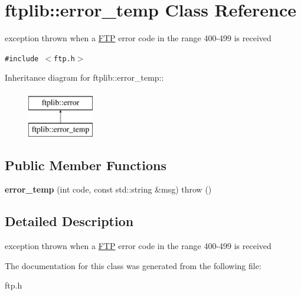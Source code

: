 \hypertarget{classftplib_1_1error__temp}{
\section{ftplib::error\_\-temp Class Reference}
\label{classftplib_1_1error__temp}
}
exception thrown when a \hyperlink{classftplib_1_1FTP}{FTP} error code in the range 400-499 is received  


{\tt \#include $<$ftp.h$>$}

Inheritance diagram for ftplib::error\_\-temp::\begin{figure}[H]
\begin{center}
\leavevmode
\includegraphics[height=2cm]{classftplib_1_1error__temp}
\end{center}
\end{figure}
\subsection*{Public Member Functions}
\begin{CompactItemize}
\item 
\hypertarget{classftplib_1_1error__temp_6c8a81fc949ee5591a85d5efeb492ea2}{
\textbf{error\_\-temp} (int code, const std::string \&msg)  throw ()}
\label{classftplib_1_1error__temp_6c8a81fc949ee5591a85d5efeb492ea2}

\end{CompactItemize}


\subsection{Detailed Description}
exception thrown when a \hyperlink{classftplib_1_1FTP}{FTP} error code in the range 400-499 is received 

The documentation for this class was generated from the following file:\begin{CompactItemize}
\item 
ftp.h\end{CompactItemize}
